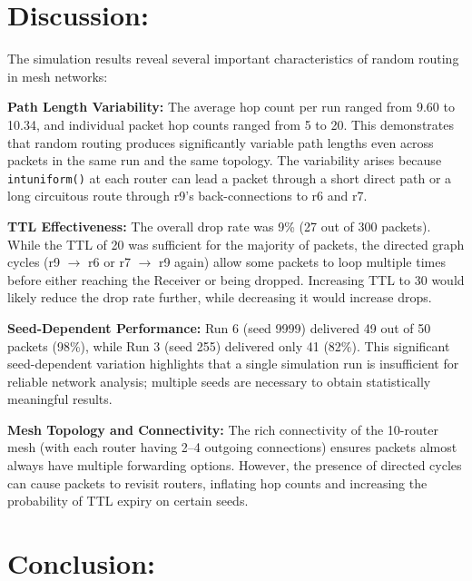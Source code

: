 \documentclass[12pt,a4paper]{article}
\begin{document}
\section{Discussion: }

\justifying
The simulation results reveal several important characteristics of random routing in mesh networks:

\textbf{Path Length Variability:} The average hop count per run ranged from 9.60 to 10.34, and individual packet hop counts ranged from 5 to 20. This demonstrates that random routing produces significantly variable path lengths even across packets in the same run and the same topology. The variability arises because \texttt{intuniform()} at each router can lead a packet through a short direct path or a long circuitous route through r9's back-connections to r6 and r7.

\textbf{TTL Effectiveness:} The overall drop rate was 9\% (27 out of 300 packets). While the TTL of 20 was sufficient for the majority of packets, the directed graph cycles (r9 $\to$ r6 or r7 $\to$ r9 again) allow some packets to loop multiple times before either reaching the Receiver or being dropped. Increasing TTL to 30 would likely reduce the drop rate further, while decreasing it would increase drops.

\textbf{Seed-Dependent Performance:} Run 6 (seed 9999) delivered 49 out of 50 packets (98\%), while Run 3 (seed 255) delivered only 41 (82\%). This significant seed-dependent variation highlights that a single simulation run is insufficient for reliable network analysis; multiple seeds are necessary to obtain statistically meaningful results.

\textbf{Mesh Topology and Connectivity:} The rich connectivity of the 10-router mesh (with each router having 2--4 outgoing connections) ensures packets almost always have multiple forwarding options. However, the presence of directed cycles can cause packets to revisit routers, inflating hop counts and increasing the probability of TTL expiry on certain seeds.

\section{Conclusion: }
\end{document}
